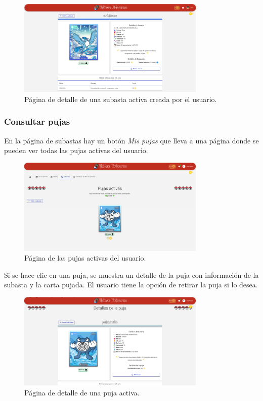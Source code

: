 \begin{enumerate}
\begin{figure}[H]
    \centering
    \includegraphics[width=0.8\textwidth]{figures/6-Analisis/6-Interfaz/interfaz/mi_subasta_detalle.png}
    \caption{Página de detalle de una subasta activa creada por el usuario.}
    \label{fig:interfaz-detalle-mi-subasta}
\end{figure}


\subsubsection{Consultar pujas}
En la página de subastas hay un botón \textit{Mis pujas} que lleva a una página donde se pueden ver todas las pujas activas del usuario.
\begin{figure}[H]
    \centering
    \includegraphics[width=0.8\textwidth]{figures/6-Analisis/6-Interfaz/interfaz/pujas-activas.png}
    \caption{Página de las pujas activas del usuario.}
    \label{fig:m-interfaz-mis-pujas}
\end{figure}

Si se hace clic en una puja, se muestra un detalle de la puja con información de la subasta y la carta pujada. 
El usuario tiene la opción de retirar la puja si lo desea.
\begin{figure}[H]
    \centering
    \includegraphics[width=0.8\textwidth]{figures/6-Analisis/6-Interfaz/interfaz/detalle-puja.png}
    \caption{Página de detalle de una puja activa.}
    \label{fig:m-interfaz-detalle-puja}
\end{figure}



\end{enumerate}
